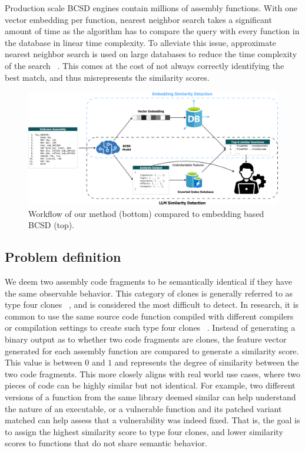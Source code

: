 Production scale BCSD engines contain millions of assembly functions. With one vector embedding per function, nearest neighbor
search takes a significant amount of time as the algorithm has to compare the query with every function in the database in linear
time complexity. To alleviate this issue, approximate nearest neighbor search is used on large databases to reduce the time
complexity of the search ~\cite{ANN,ANN-limits}. This comes at the cost of not always correctly identifying the best match, and thus
misrepresents the similarity scores.

\begin{figure}
\centerline{\includegraphics[width=\linewidth]{BCSD-schematic}}
\caption{Workflow of our method (bottom) compared to embedding based BCSD (top).}
\label{BCSD-workflow}
\end{figure}

\subsection{Problem definition}

We deem two assembly code fragments to be semantically identical if they have the same observable behavior.
This category of clones is generally referred to as type four clones ~\cite{Asm2Vec,BinClone}, and is considered the most difficult
to detect. In research, it is common to use the same source code function compiled with different compilers or compilation
settings to create such type four clones ~\cite{SAFE,PalmTree,OrderMatters,Asm2Vec,CLAP}. Instead of generating a binary output as
to whether two code fragments are clones, the feature vector generated for each assembly function are compared to generate a similarity score.
This value is between \(0\) and \(1\) and represents the degree of similarity between the two code fragments. This more closely aligns with
real world use cases, where two pieces of code can be highly similar but not identical. For example, two different versions of a function
from the same library deemed similar can help understand the nature of an executable, or a vulnerable function and its patched variant matched
can help assess that a vulnerability was indeed fixed. That is, the goal is to assign the highest similarity score to type four
clones, and lower similarity scores to functions that do not share semantic behavior. 

